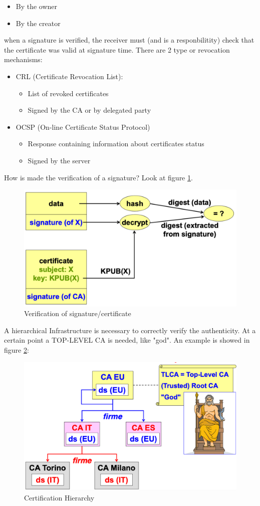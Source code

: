 \documentclass[12pt]{article}
\begin{document}
\begin{itemize}
  \item By the owner
  \item By the creator
\end{itemize}
when a signature is verified, the receiver must (and is a responbilitity) check that the certificate was valid at signature time. There are 2 type or revocation mechanisms:
\begin{itemize}
  \item CRL (Certificate Revocation List):
  \begin{itemize}
    \item List of revoked certificates
    \item Signed by the CA or by delegated party
  \end{itemize}
  \item OCSP (On-line Certificate Status Protocol)
  \begin{itemize}
    \item Response containing information about certificates status
    \item Signed by the server
  \end{itemize}
\end{itemize}
How is made the verification of a signature? Look at figure \ref{fig:very_sign}.
\begin{figure}[H]
   \centering
   \includegraphics[width=\linewidth]{images/very_sign.png}
   \caption{Verification of signature/certificate}
   \label{fig:very_sign}
\end{figure}
A hierarchical Infrastructure is necessary to correctly verify the authenticity. At a certain point a TOP-LEVEL CA is needed, like "god". An example is showed in figure \ref{fig:ca_god}:
\begin{figure}[H]
   \centering
   \includegraphics[width=\linewidth]{images/ca_god.png}
   \caption{Certification Hierarchy}
   \label{fig:ca_god}
\end{figure}
\end{document}
